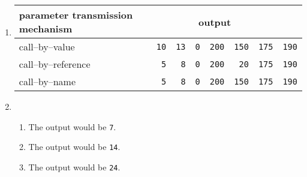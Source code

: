 \documentclass[11pt]{article}
\begin{document}

  \begin{enumerate}

    \addtolength{\itemsep}{8mm}

    \item {

            \renewcommand{\arraystretch}{1.5}

            \begin{tabular}[t]{l|rrrrrrr}

              parameter transmission mechanism
                & \multicolumn{6}{c}{output}
                \\

              \hline

              call--by--value &
                \texttt{10} &
                \texttt{13} &
                \texttt{0} &
                \texttt{200} &
                \texttt{150} &
                \texttt{175} &
                \texttt{190} \\

              call--by--reference &
                \texttt{5} &
                \texttt{8} &
                \texttt{0} &
                \texttt{200} &
                \texttt{20} &
                \texttt{175} &
                \texttt{190} \\

              call--by--name &
                \texttt{5} &
                \texttt{8} &
                \texttt{0} &
                \texttt{200} &
                \texttt{150} &
                \texttt{175} &
                \texttt{190} \\

            \end{tabular}

          }

    \item \begin{enumerate}

            \addtolength{\itemsep}{2mm}

            \item The output would be \texttt{7}.

            \item The output would be \texttt{14}.

            \item The output would be \texttt{24}.

          \end{enumerate}


\end{enumerate}
\end{document}
